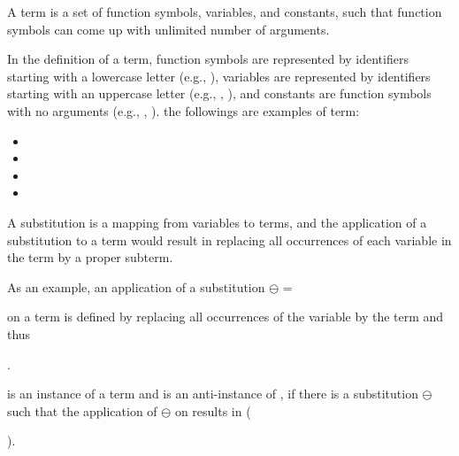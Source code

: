 \begin{defn}[Term]\label{def:term} 
A term is a set of function symbols, variables, and constants, such that function symbols can come up with unlimited number of arguments. 
\end{defn}

In the definition of a term, function symbols are represented by identifiers starting with a lowercase letter (e.g., ), variables are represented by identifiers starting with an uppercase letter (e.g., , ), and constants are function symbols with no arguments (e.g., , ). the followings are examples of term:
\begin{itemize} [leftmargin=0.7in]
\item {}
\item {}
\item {}
\item {}
\end{itemize}
\begin{defn}\label{def:substitution} 
A substitution is a mapping from variables to terms, and the application of a substitution to a term would result in replacing all occurrences of each variable in the term by a proper subterm.
\end{defn}

As an example, an application of a substitution $\ominus$ =
 on a term  is defined by replacing all occurrences of the variable  by the term  and thus.


\begin{defn}\label{def:instance} 
  is an instance of a term  and  is an anti-instance of , if there is a substitution $\ominus$ such that the application of $\ominus$ on  results in  ().
\end{defn} 

